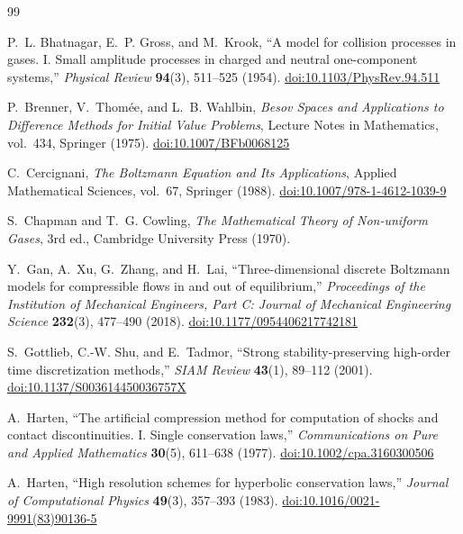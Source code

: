 \documentclass[11pt]{article}
\theoremstyle{remark}
\begin{document}
\begin{thebibliography}{99}
\small

P.~L. Bhatnagar, E.~P. Gross, and M.~Krook,
``A model for collision processes in gases. I. Small amplitude processes in charged and neutral one-component systems,''
\emph{Physical Review} \textbf{94}(3), 511--525 (1954).
\href{https://doi.org/10.1103/PhysRev.94.511}{doi:10.1103/PhysRev.94.511}

P.~Brenner, V.~Thom\'ee, and L.~B. Wahlbin,
\emph{Besov Spaces and Applications to Difference Methods for Initial Value Problems},
Lecture Notes in Mathematics, vol.~434, Springer (1975).
\href{https://doi.org/10.1007/BFb0068125}{doi:10.1007/BFb0068125}

C.~Cercignani,
\emph{The Boltzmann Equation and Its Applications},
Applied Mathematical Sciences, vol.~67, Springer (1988).
\href{https://doi.org/10.1007/978-1-4612-1039-9}{doi:10.1007/978-1-4612-1039-9}

S.~Chapman and T.~G. Cowling,
\emph{The Mathematical Theory of Non-uniform Gases}, 3rd ed.,
Cambridge University Press (1970).

Y.~Gan, A.~Xu, G.~Zhang, and H.~Lai,
``Three-dimensional discrete Boltzmann models for compressible flows in and out of equilibrium,''
\emph{Proceedings of the Institution of Mechanical Engineers, Part C: Journal of Mechanical Engineering Science}
\textbf{232}(3), 477--490 (2018).
\href{https://doi.org/10.1177/0954406217742181}{doi:10.1177/0954406217742181}

S.~Gottlieb, C.-W. Shu, and E.~Tadmor,
``Strong stability-preserving high-order time discretization methods,''
\emph{SIAM Review} \textbf{43}(1), 89--112 (2001).
\href{https://doi.org/10.1137/S003614450036757X}{doi:10.1137/S003614450036757X}

A.~Harten,
``The artificial compression method for computation of shocks and contact discontinuities. I. Single conservation laws,''
\emph{Communications on Pure and Applied Mathematics} \textbf{30}(5), 611--638 (1977).
\href{https://doi.org/10.1002/cpa.3160300506}{doi:10.1002/cpa.3160300506}

A.~Harten,
``High resolution schemes for hyperbolic conservation laws,''
\emph{Journal of Computational Physics} \textbf{49}(3), 357--393 (1983).
\href{https://doi.org/10.1016/0021-9991(83)90136-5}{doi:10.1016/0021-9991(83)90136-5}


\end{thebibliography}
\end{document}
